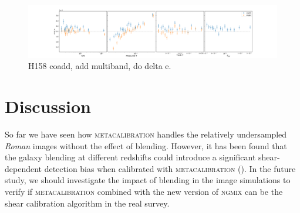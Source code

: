 \documentclass[fleqn,usenatbib]{mnras}
\begin{document}
\begin{figure}
    \hspace*{-3.5cm}
    \centering
	\includegraphics[scale=0.34]{H158_meanshear_measured_properties_perbin.pdf}
    \caption{H158 coadd, add multiband, do delta e.}
    \label{fig:meanshear}
\end{figure}


\section{Discussion}
\label{sec:discussion}

So far we have seen how \textsc{metacalibration} handles the relatively undersampled \emph{Roman} images without the effect of blending. However, it has been found that the galaxy blending at different redshifts could introduce a significant shear-dependent detection bias when calibrated with \textsc{metacalibration} (\citealt{2020ApJ...902..138S}). In the future study, we should investigate the impact of blending in the image simulations to verify if \textsc{metacalibration} combined with the new version of \textsc{ngmix} can be the shear calibration algorithm in the real survey. 
\end{document}
